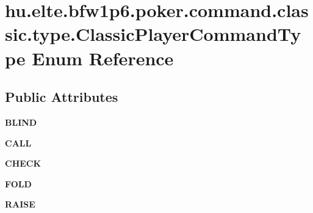\hypertarget{enumhu_1_1elte_1_1bfw1p6_1_1poker_1_1command_1_1classic_1_1type_1_1_classic_player_command_type}{}\section{hu.\+elte.\+bfw1p6.\+poker.\+command.\+classic.\+type.\+Classic\+Player\+Command\+Type Enum Reference}
\label{enumhu_1_1elte_1_1bfw1p6_1_1poker_1_1command_1_1classic_1_1type_1_1_classic_player_command_type}
\subsection*{Public Attributes}
\begin{DoxyCompactItemize}
\item 
\hypertarget{enumhu_1_1elte_1_1bfw1p6_1_1poker_1_1command_1_1classic_1_1type_1_1_classic_player_command_type_ac316918a96eb20ab10f412ffdbfa0736}{}{\bfseries B\+L\+I\+N\+D}\label{enumhu_1_1elte_1_1bfw1p6_1_1poker_1_1command_1_1classic_1_1type_1_1_classic_player_command_type_ac316918a96eb20ab10f412ffdbfa0736}

\item 
\hypertarget{enumhu_1_1elte_1_1bfw1p6_1_1poker_1_1command_1_1classic_1_1type_1_1_classic_player_command_type_a40e5fbad50f1c5c54eb45611767d555f}{}{\bfseries C\+A\+L\+L}\label{enumhu_1_1elte_1_1bfw1p6_1_1poker_1_1command_1_1classic_1_1type_1_1_classic_player_command_type_a40e5fbad50f1c5c54eb45611767d555f}

\item 
\hypertarget{enumhu_1_1elte_1_1bfw1p6_1_1poker_1_1command_1_1classic_1_1type_1_1_classic_player_command_type_ac7e16fcff42d3f8d697dab37d6980a75}{}{\bfseries C\+H\+E\+C\+K}\label{enumhu_1_1elte_1_1bfw1p6_1_1poker_1_1command_1_1classic_1_1type_1_1_classic_player_command_type_ac7e16fcff42d3f8d697dab37d6980a75}

\item 
\hypertarget{enumhu_1_1elte_1_1bfw1p6_1_1poker_1_1command_1_1classic_1_1type_1_1_classic_player_command_type_a0593b65a8e466173283a46c4f25d895b}{}{\bfseries F\+O\+L\+D}\label{enumhu_1_1elte_1_1bfw1p6_1_1poker_1_1command_1_1classic_1_1type_1_1_classic_player_command_type_a0593b65a8e466173283a46c4f25d895b}

\item 
\hypertarget{enumhu_1_1elte_1_1bfw1p6_1_1poker_1_1command_1_1classic_1_1type_1_1_classic_player_command_type_a389054d00c84101a16c510cea4616d76}{}{\bfseries R\+A\+I\+S\+E}\label{enumhu_1_1elte_1_1bfw1p6_1_1poker_1_1command_1_1classic_1_1type_1_1_classic_player_command_type_a389054d00c84101a16c510cea4616d76}


\end{DoxyCompactItemize}
